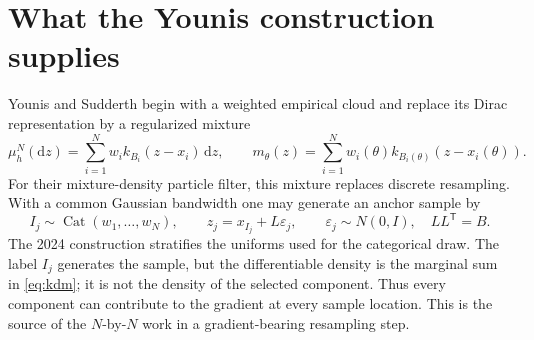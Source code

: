\documentclass[11pt]{article}
\newcommand{\dd}{\mathrm{d}}
\begin{document}
\section{What the Younis construction supplies}

Younis and Sudderth begin with a weighted empirical cloud and replace its
Dirac representation by a regularized mixture
\begin{equation}
 \mu_h^N(\dd z)
   = \sum_{i=1}^{N} w_i k_{B_i}(z-x_i)\,\dd z,
 \qquad
 m_\theta(z)=\sum_{i=1}^{N}
       w_i(\theta)k_{B_i(\theta)}(z-x_i(\theta)).
 \label{eq:kdm}
\end{equation}
For their mixture-density particle filter, this mixture replaces discrete
resampling.  With a common Gaussian bandwidth one may generate an anchor
sample by
\begin{equation}
 I_j\sim\operatorname{Cat}(w_1,\ldots,w_N),\qquad
 z_j=x_{I_j}+L\varepsilon_j,\qquad
 \varepsilon_j\sim N(0,I),\quad LL^\mathsf{T}=B.
 \label{eq:younis-sampling}
\end{equation}
The 2024 construction stratifies the uniforms used for the categorical draw.
The label $I_j$ generates the sample, but the differentiable density is the
marginal sum in \eqref{eq:kdm}; it is not the density of the selected
component.  Thus every component can contribute to the gradient at every
sample location.  This is the source of the $N$-by-$N$ work in a
gradient-bearing resampling step.
\end{document}
